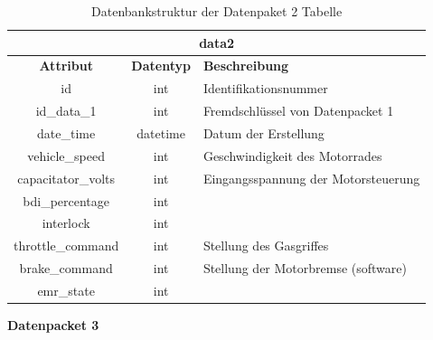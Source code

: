 \begin{table}[H]
	\begin{center}
		\begin{tabular}{|c|c|l|}
			\hline
			\multicolumn{3}{|c|}{\textbf{data2}} \\ \hline
			\textbf{Attribut}  & \textbf{Datentyp} & \textbf{Beschreibung}               \\ \hline
			id                 & int               & Identifikationsnummer               \\ \hline
			id\_data\_1        & int               & Fremdschlüssel von Datenpacket 1    \\ \hline
			date\_time         & datetime          & Datum der Erstellung                \\ \hline
			vehicle\_speed     & int               & Geschwindigkeit des Motorrades      \\ \hline
			capacitator\_volts & int               & Eingangsspannung der Motorsteuerung \\ \hline
			bdi\_percentage    & int               &                                     \\ \hline
			interlock          & int               &                                     \\ \hline
			throttle\_command  & int               & Stellung des Gasgriffes             \\ \hline
			brake\_command     & int               & Stellung der Motorbremse (software) \\ \hline
			emr\_state         & int               &                                     \\ \hline
		\end{tabular}
			\caption{Datenbankstruktur der Datenpaket 2 Tabelle}
			\label{tab:data2}
	\end{center}
\end{table}

\textbf{Datenpacket 3}

